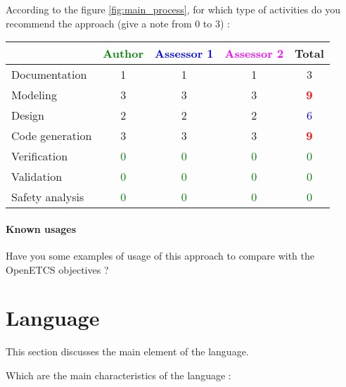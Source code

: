 According to the figure \ref{fig:main_process}, for which type of activities do you recommend the approach (give a note from 0 to  3) :

\begin{tabular}{|l | c | c | c | c|}
\hline
& \textcolor{green}{Author} & \textcolor{blue}{Assessor 1} & \textcolor{magenta}{Assessor 2} & Total \\
\hline 
Documentation &1 &1 & 1     & 3     \\
\hline
Modeling &3 &3 & 3    & \textcolor{red}{\textbf{9}} \\
\hline
Design &2 &2 & 2     & \textcolor{blue}{6} \\
\hline
Code generation &3 &3 & 3    & \textcolor{red}{\textbf{9}} \\
\hline
Verification & \textcolor{green}{0}   & \textcolor{green}{0}   & \textcolor{green}{0} & \textcolor{green}{0} \\
\hline
Validation & \textcolor{green}{0}   & \textcolor{green}{0}   & \textcolor{green}{0} & \textcolor{green}{0} \\
\hline
Safety analysis & \textcolor{green}{0}   & \textcolor{green}{0}   & \textcolor{green}{0} & \textcolor{green}{0} \\
\hline
\end{tabular}

\paragraph{Known usages} Have you some examples of usage of this approach to  compare with the OpenETCS objectives ?

\section{Language}
This section discusses the main element of the language.

Which are the main characteristics of the language :

